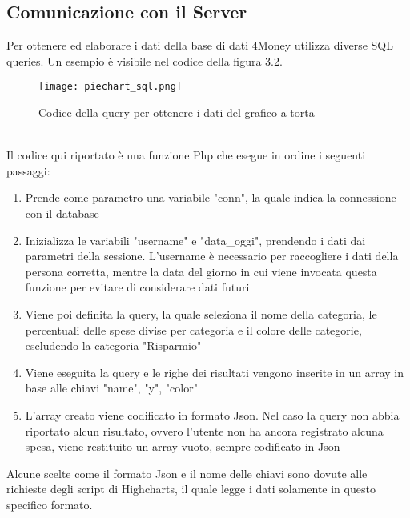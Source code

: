 \documentclass[binding=0.6cm, oneside, noexaminfo, italian]{sapthesis}
\begin{document}
\subsection{Comunicazione con il Server}
Per ottenere ed elaborare i dati della base di dati 4Money utilizza diverse SQL queries. Un esempio è visibile nel codice della figura 3.2. \\
\begin{figure}[h]
    \centering
    \texttt{[image: piechart\_sql.png]}
    \caption{Codice della query per ottenere i dati del grafico a torta}
    \label{fig:oiechart_code}
\end{figure} \\
Il codice qui riportato è una funzione Php che esegue in ordine i seguenti passaggi:
\begin{enumerate}
    \item Prende come parametro una variabile "conn", la quale indica la connessione con il database
    \item Inizializza le variabili "username" e "data\_oggi", prendendo i dati dai parametri della sessione. L'username è necessario per raccogliere i dati della persona corretta, mentre la data del giorno in cui viene invocata questa funzione per evitare di considerare dati futuri
    \item Viene poi definita la query, la quale seleziona il nome della categoria, le percentuali delle spese divise per categoria e il colore delle categorie, escludendo la categoria "Risparmio"
    \item Viene eseguita la query e le righe dei risultati vengono inserite in un array in base alle chiavi "name", "y", "color"
    \item L'array creato viene codificato in formato Json. Nel caso la query non abbia riportato alcun risultato, ovvero l'utente non ha ancora registrato alcuna spesa, viene restituito un array vuoto, sempre codificato in Json
\end{enumerate}
Alcune scelte come il formato Json e il nome delle chiavi sono dovute alle richieste degli script di Highcharts, il quale legge i dati solamente in questo specifico formato.
\end{document}
